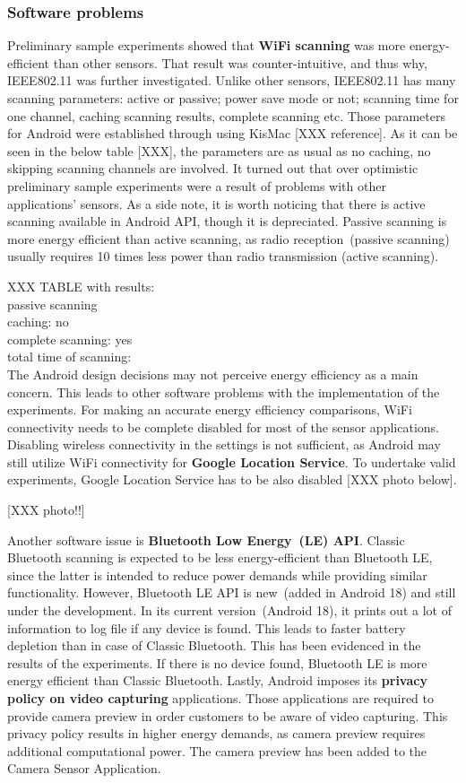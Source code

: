 \subsubsection{Software problems}
Preliminary sample experiments showed that \textbf{WiFi scanning} was more energy-efficient than other sensors. That result was counter-intuitive, and thus why, IEEE802.11 was further investigated. Unlike other sensors, IEEE802.11 has many scanning parameters: active or passive; power save mode or not; scanning time for one channel, caching scanning results, complete scanning etc. Those parameters for Android were established through using KisMac [XXX reference]. As it can be seen in the below table [XXX], the parameters are as usual as no caching, no skipping  scanning channels are involved. It turned out that over optimistic preliminary sample experiments were a result of problems with other applications' sensors. As a side note, it is worth noticing that there is active scanning available in Android API, though it is depreciated. Passive scanning is more energy efficient than active scanning, as radio reception\ (passive scanning) usually requires 10 times less power than radio transmission (active scanning).


XXX TABLE with results:\\
passive scanning\\
caching: no\\
complete scanning: yes\\
total time of scanning:\\


The Android design decisions may not perceive energy efficiency as a main concern. This leads to other software problems with the implementation of the experiments. For making an accurate energy efficiency comparisons, WiFi connectivity needs to be complete disabled for most of the sensor applications. Disabling wireless connectivity in the settings is not sufficient, as Android may still utilize WiFi connectivity for \textbf{Google Location Service}. To undertake valid experiments, Google Location Service has to be also disabled [XXX photo below].

[XXX photo!!]

Another software issue is \textbf{Bluetooth Low Energy\ (LE) API}. Classic Bluetooth scanning is expected to be less energy-efficient than Bluetooth LE, since the latter is intended to reduce power demands while providing similar functionality. However, Bluetooth LE API is new\ (added in Android 18) and still under the development. In its current version\ (Android 18),  it prints out a lot of information to log file if any device is found. This leads to faster battery depletion than in case of Classic Bluetooth. This has been evidenced in the results of the experiments. If there is no device found, Bluetooth LE is more energy efficient than Classic Bluetooth. Lastly, Android imposes its \textbf{privacy policy on video capturing} applications. Those applications are required to provide camera preview in order customers to be aware of video capturing. This privacy policy results in higher energy demands, as camera preview requires additional computational power. The camera preview has been added to the Camera Sensor Application.

